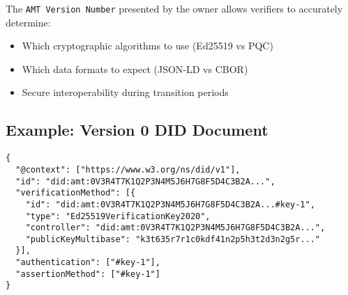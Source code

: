 The \texttt{AMT Version Number} presented by the owner allows verifiers to accurately determine:
\begin{itemize}
  \item Which cryptographic algorithms to use (Ed25519 vs PQC)
  \item Which data formats to expect (JSON-LD vs CBOR)
  \item Secure interoperability during transition periods
\end{itemize}

\subsection{Example: Version 0 DID Document}

\begin{verbatim}
{
  "@context": ["https://www.w3.org/ns/did/v1"],
  "id": "did:amt:0V3R4T7K1Q2P3N4M5J6H7G8F5D4C3B2A...",
  "verificationMethod": [{
    "id": "did:amt:0V3R4T7K1Q2P3N4M5J6H7G8F5D4C3B2A...#key-1",
    "type": "Ed25519VerificationKey2020",
    "controller": "did:amt:0V3R4T7K1Q2P3N4M5J6H7G8F5D4C3B2A...",
    "publicKeyMultibase": "k3t635r7r1c0kdf41n2p5h3t2d3n2g5r..."
  }],
  "authentication": ["#key-1"],
  "assertionMethod": ["#key-1"]
}
\end{verbatim}

